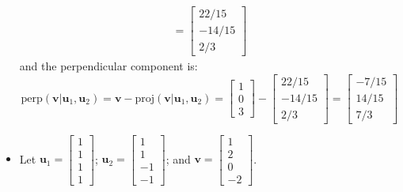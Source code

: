 \documentclass{article}
\begin{document}
\begin{itemize}
\begin{align*}
= \begin{bmatrix} 22/15 \\ -14/15 \\ 2/3 \end{bmatrix}
\end{align*}
and the perpendicular component is:
\[\text{perp}(\mathbf{v} | \mathbf{u}_1, \mathbf{u}_2) = \mathbf{v} - \text{proj}(\mathbf{v} | \mathbf{u}_1, \mathbf{u}_2) = \begin{bmatrix} 1 \\ 0 \\ 3 \end{bmatrix} - \begin{bmatrix} 22/15 \\ -14/15 \\ 2/3 \end{bmatrix} = \begin{bmatrix} -7/15 \\ 14/15 \\ 7/3 \end{bmatrix}\]
\item Let \(\mathbf{u}_1 = \begin{bmatrix} 1 \\ 1 \\ 1 \\ 1 \end{bmatrix}\); \(\mathbf{u}_2 = \begin{bmatrix} 1 \\ 1 \\ -1 \\ -1 \end{bmatrix}\); and \(\mathbf{v} = \begin{bmatrix} 1 \\ 2 \\ 0 \\ -2 \end{bmatrix}\).


\end{itemize}
\end{document}
